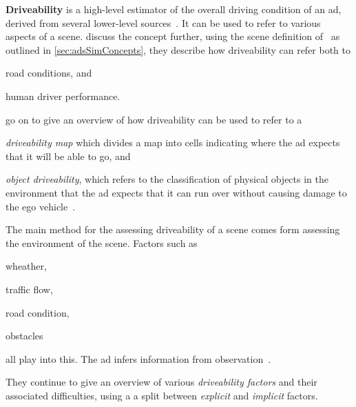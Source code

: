 \textbf{Driveability} is a high-level estimator of the overall driving
condition of an \acrshort{ad}, derived from several lower-level sources~\cite[3140]{safeToDrive}.
It can be used to refer to various aspects of a scene.
\citeauthor{safeToDrive} discuss the concept further, using the  scene definition
of~\citeauthor{scenes} as outlined in  \cref{sec:adsSimConcepts}, they describe
how driveability can refer both to \begin{inparaenum}
    \item road conditions, and
    \item human driver performance.
\end{inparaenum}
\citeauthor{safeToDrive} go on to give an overview of how driveability
can be used to refer to a \begin{inparaenum}\setcounter{enumi}{2}
    \item \textit{driveability map} which divides a map into
    cells indicating where the \acrshort{ad} expects that it will be able to go, and
    \item \textit{object driveability}, which refers to the classification of physical
    objects in the environment that the \acrshort{ad} expects that it can run over
    without causing damage to the ego vehicle~\cite[3135-3136]{safeToDrive}.
\end{inparaenum}

The main method for the assessing driveability of a scene comes form assessing the environment
of the scene. Factors such as \begin{inparaenum}
    \item wheather,
    \item traffic flow,
    \item road condition,
    \item obstacles
\end{inparaenum} all play into this. The \acrshort{ad} infers information from
observation~\cite[3136]{safeToDrive}.

They continue to give an overview of various \textit{driveability factors} and
their associated difficulties, using a a split between \textit{explicit} and
\textit{implicit} factors.

